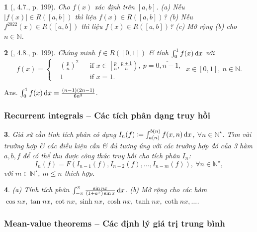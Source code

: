 \documentclass{article}
\newtheorem{baitoan}{}
\begin{document}
\begin{baitoan}[\cite{Quoc_Long_Dat_Nam_VMC}, 4.7., p. 199]
	Cho $f(x)$ xác định trên $[a,b]$. (a) Nếu $|f(x)|\in R([a,b])$ thì liệu $f(x)\in R([a,b])$? (b) Nếu $f^{2022}(x)\in R([a,b])$ thì liệu $f(x)\in R([a,b])$? (c) Mở rộng (b) cho $n\in\mathbb{N}$.
\end{baitoan}

\begin{baitoan}[\cite{Quoc_Long_Dat_Nam_VMC}, 4.8., p. 199]
	Chứng minh $f\in R([0,1])$ \& tính $\int_0^1 f(x)\,{\rm d}x$ với
	\begin{equation*}
		f(x) = \left\{\begin{split}
			&\left(\frac{p}{n}\right)^2&&\mbox{if } x\in\left[\frac{p}{n},\frac{p + 1}{n}\right),\ p = \overline{0,n-1},\\
			&1&&\mbox{if } x = 1.
		\end{split}\right.\ x\in[0,1],\ n\in\mathbb{N}.
	\end{equation*}
\end{baitoan}
{\sf Ans.} $\int_0^1 f(x)\,{\rm d}x = \frac{(n - 1)(2n - 1)}{6n^2}$.

\subsubsection{Recurrent integrals -- Các tích phân dạng truy hồi}

\begin{baitoan}
	Giả sử cần tính tích phân có dạng $I_n(f)\coloneqq\int_{a(n)}^{b(n)} f(x,n)\,{\rm d}x$, $\forall n\in\mathbb{N}^\star$. Tìm vài trường hợp \& các điều kiện cần \& đủ tương ứng với các trường hợp đó của 3 hàm $a,b,f$ để có thể thu được công thức truy hồi cho tích phân $I_n$:
	\begin{equation*}
		I_n(f) = F(I_{n-1}(f),I_{n-2}(f),\ldots,I_{n-m}(f)),\ \forall n\in\mathbb{N}^\star,
	\end{equation*}
	với $m\in\mathbb{N}^\star$, $m\le n$ thích hợp.
\end{baitoan}

\begin{baitoan}
	(a) Tính tích phân $\int_{-\pi}^\pi \frac{\sin nx}{(1 + a^x)\sin x}\,{\rm d}x$. (b) Mở rộng cho các hàm $\cos nx,\tan nx,\cot nx,\sinh nx,\cosh nx,\tanh nx,\coth nx,\ldots$.
\end{baitoan}

\subsubsection{Mean-value theorems -- Các định lý giá trị trung bình}
\end{document}
